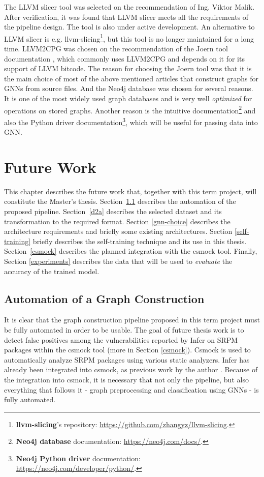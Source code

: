 The LLVM slicer tool was selected on the recommendation of Ing. Viktor Malík. After verification, it was found that LLVM slicer meets all the requirements of the pipeline design. The tool is also under active development. An alternative to LLVM slicer is e.g. llvm-slicing\footnote{\textbf{llvm-slicing}'s repository: \url{https://github.com/zhangyz/llvm-slicing}.}, but this tool is no longer maintained for a long time. LLVM2CPG was chosen on the recommendation of the Joern tool documentation \cite{joern-doc}, which commonly uses LLVM2CPG and depends on it for its support of LLVM bitcode. The reason for choosing the Joern tool was that it is the main choice of most of the above mentioned articles that construct graphs for GNNs from source files. And the Neo4j database was chosen for several reasons. It is one of the most widely used graph databases and is very well \textit{optimized} for operations on stored graphs. Another reason is the intuitive documentation\footnote{\textbf{Neo4j database} documentation: \url{https://neo4j.com/docs/}.} and also the Python driver documentation\footnote{\textbf{Neo4j Python driver} documentation: \url{https://neo4j.com/developer/python/}.}, which will be useful for passing data into
GNN.


\chapter{Future Work}
\label{future-work}

This chapter describes the future work that, together with this term project, will constitute the Master's thesis. Section~\ref{automation} describes the automation of the proposed pipeline. Section~\ref{d2a} describes the selected dataset and its transformation to the required format. Section \ref{gnn-choice} describes the architecture requirements and briefly some existing architectures. Section \ref{self-training} briefly describes the self-training technique and its use in this thesis. Section~\ref{csmock} describes the planned integration with the csmock tool. Finally, Section \ref{experiments} describes the data that will be used to \textit{evaluate} the accuracy of the trained model.

\section{Automation of a Graph Construction}
\label{automation}

It is clear that the graph construction pipeline proposed in this term project must be fully automated in order to be usable. The goal of future thesis work is to detect false positives among the vulnerabilities reported by Infer on SRPM packages within the csmock tool (more in Section \ref{csmock}). Csmock is used to automatically analyze SRPM packages using various static analyzers. Infer has already been integrated into csmock, as previous work by the author \cite{bc}. Because of the integration into csmock, it is necessary that not only the pipeline, but also everything that follows it - graph preprocessing and classification using GNNs - is fully automated.

